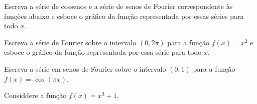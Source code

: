 \documentclass[a4paper,12pt, leqno, answers]{exam}
\begin{document}
\begin{questions}
    \question Escreva a s\'{e}rie de cossenos e a s\'{e}rie de senos de Fourier correspondente \`{a}s fun\c{c}\~{o}es abaixo e esboce o gr\'{a}fico da fun\c{c}\~{a}o representada por essas s\'{e}ries para todo $x$.

    \question Escreva a s\'{e}rie de Fourier sobre o intervalo $(0, 2\pi)$ para a fun\c{c}\~{a}o $f(x) = x^2$ e esboce o gr\'{a}fico da fun\c{c}\~{a}o representada por essa s\'{e}rie para todo $x$.
    \begin{solution}
    \end{solution}

    \question Escreva a s\'{e}rie em senos de Fourier sobre o intervalo $(0, 1)$ para a fun\c{c}\~{a}o $f(x) = \cos(\pi x)$.
    \begin{solution}
    \end{solution}

    \question[P1 de 2006] Considdere a fun\c{c}\~{a}o $f(x) = x^3 + 1$.
    \begin{parts}

\end{parts}
\end{questions}
\end{document}
